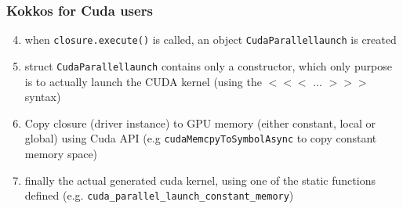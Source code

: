 \begin{frame}[fragile=singleslide]
  \frametitle{Kokkos for Cuda users}


  \begin{enumerate}
    \setcounter{enumi}{3}
  \item when \texttt{closure.execute()} is called, an object \texttt{CudaParallellaunch} is created
  \item struct \texttt{CudaParallellaunch} contains only a constructor, which only purpose is to actually launch the CUDA kernel (using the $<<<$ ... $>>>$ syntax)
  \item Copy closure (driver instance) to GPU memory (either constant, local or global) using Cuda API (e.g \texttt{cudaMemcpyToSymbolAsync} to copy constant memory space)
  \item finally the actual generated cuda kernel, using one of the static functions defined (e.g. \texttt{cuda\_parallel\_launch\_constant\_memory})
  \end{enumerate}

\end{frame}

